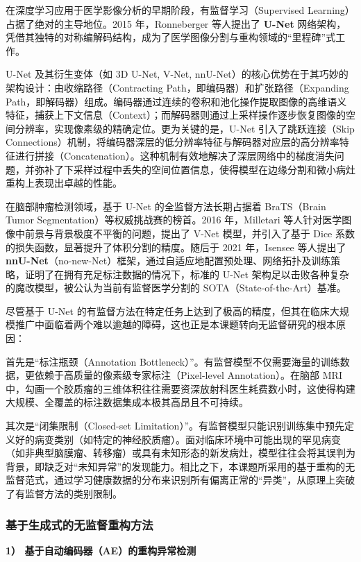 \documentclass[Win]{xjtuBSThesis}  %
\begin{document}
在深度学习应用于医学影像分析的早期阶段，有监督学习（Supervised Learning）占据了绝对的主导地位。2015 年，Ronneberger 等人提出了 \textbf{U-Net} 网络架构，凭借其独特的对称编解码结构，成为了医学图像分割与重构领域的“里程碑”式工作。

U-Net 及其衍生变体（如 3D U-Net, V-Net, nnU-Net）的核心优势在于其巧妙的架构设计：由收缩路径（Contracting Path，即编码器）和扩张路径（Expanding Path，即解码器）组成。编码器通过连续的卷积和池化操作提取图像的高维语义特征，捕获上下文信息（Context）；而解码器则通过上采样操作逐步恢复图像的空间分辨率，实现像素级的精确定位。更为关键的是，U-Net 引入了跳跃连接（Skip Connections）机制，将编码器深层的低分辨率特征与解码器对应层的高分辨率特征进行拼接（Concatenation）。这种机制有效地解决了深层网络中的梯度消失问题，并弥补了下采样过程中丢失的空间位置信息，使得模型在边缘分割和微小病灶重构上表现出卓越的性能。

在脑部肿瘤检测领域，基于 U-Net 的全监督方法长期占据着 BraTS（Brain Tumor Segmentation）等权威挑战赛的榜首。2016 年，Milletari 等人针对医学图像中前景与背景极度不平衡的问题，提出了 V-Net 模型，并引入了基于 Dice 系数的损失函数，显著提升了体积分割的精度。随后于 2021 年，Isensee 等人提出了 \textbf{nnU-Net}（no-new-Net）框架，通过自适应地配置预处理、网络拓扑及训练策略，证明了在拥有充足标注数据的情况下，标准的 U-Net 架构足以击败各种复杂的魔改模型，被公认为当前有监督医学分割的 SOTA（State-of-the-Art）基准。

尽管基于 U-Net 的有监督方法在特定任务上达到了极高的精度，但其在临床大规模推广中面临着两个难以逾越的障碍，这也正是本课题转向无监督研究的根本原因：

首先是“标注瓶颈（Annotation Bottleneck）”。有监督模型不仅需要海量的训练数据，更依赖于高质量的像素级专家标注（Pixel-level Annotation）。在脑部 MRI 中，勾画一个胶质瘤的三维体积往往需要资深放射科医生耗费数小时，这使得构建大规模、全覆盖的标注数据集成本极其高昂且不可持续。

其次是“闭集限制（Closed-set Limitation）”。有监督模型只能识别训练集中预先定义好的病变类别（如特定的神经胶质瘤）。面对临床环境中可能出现的罕见病变（如非典型脑膜瘤、转移瘤）或具有未知形态的新发病灶，模型往往会将其误判为背景，即缺乏对“未知异常”的发现能力。相比之下，本课题所采用的基于重构的无监督范式，通过学习健康数据的分布来识别所有偏离正常的“异类”，从原理上突破了有监督方法的类别限制。



\subsubsection{基于生成式的无监督重构方法}
\textbf{1） 基于自动编码器（AE）的重构异常检测}
\end{document}
